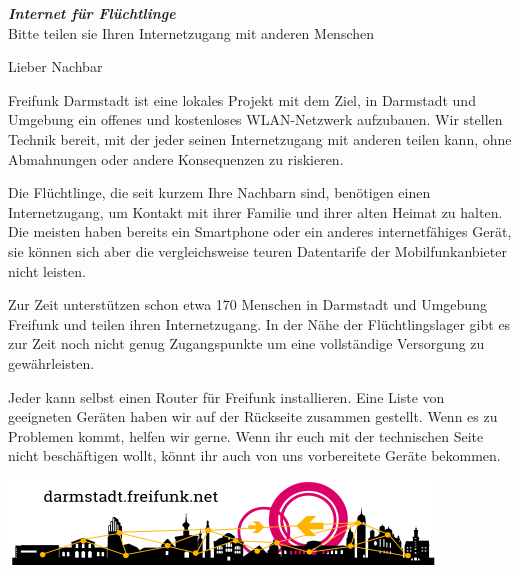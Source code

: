\documentclass[a4paper]{article}
\begin{document}
\thispagestyle{empty}
 
\begin{center}
\Huge \textit{\textbf{\textcolor{freifunkpink}{Internet für Flüchtlinge}}} \\
\vspace{0.6cm}
\large Bitte teilen sie Ihren Internetzugang mit anderen Menschen
\normalsize

\vspace{2.5cm}
\end{center}

Lieber Nachbar
\vspace{0.5cm}

Freifunk Darmstadt ist eine lokales Projekt mit dem Ziel, in Darmstadt und Umgebung ein offenes und kostenloses WLAN-Netzwerk aufzubauen. Wir stellen Technik bereit, mit der jeder seinen Internetzugang mit anderen teilen kann, ohne Abmahnungen oder andere Konsequenzen zu riskieren.

Die Flüchtlinge, die seit kurzem Ihre Nachbarn sind, benötigen einen Internetzugang, um Kontakt mit ihrer Familie und ihrer alten Heimat zu halten. Die meisten haben bereits ein Smartphone oder ein anderes internetfähiges Gerät, sie können sich aber die vergleichsweise teuren Datentarife der Mobilfunkanbieter nicht leisten.

Zur Zeit unterstützen schon etwa 170 Menschen in Darmstadt und Umgebung Freifunk und teilen ihren Internetzugang. In der Nähe der Flüchtlingslager gibt es zur Zeit noch nicht genug Zugangspunkte um eine vollständige Versorgung zu gewährleisten.

Jeder kann selbst einen Router für Freifunk installieren. Eine Liste von geeigneten Geräten haben wir auf der Rückseite zusammen gestellt. Wenn es zu Problemen kommt, helfen wir gerne.
Wenn ihr euch mit der technischen Seite nicht beschäftigen wollt, könnt ihr auch von uns vorbereitete Geräte bekommen.

\vspace{1cm}

\begin{center}
\includegraphics[width=\textwidth]{logo}
\end{center}

\newpage
\end{document}
